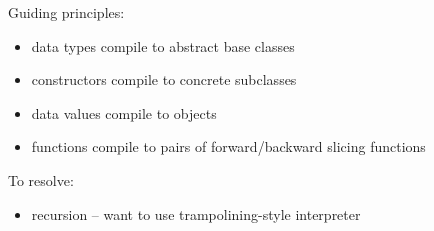 
Guiding principles:
\begin{itemize}
   \item data types compile to abstract base classes
   \item constructors compile to concrete subclasses
   \item data values compile to objects
   \item functions compile to pairs of forward/backward slicing functions
\end{itemize}

\noindent To resolve:
\begin{itemize}
   \item recursion -- want to use trampolining-style interpreter
\end{itemize}


